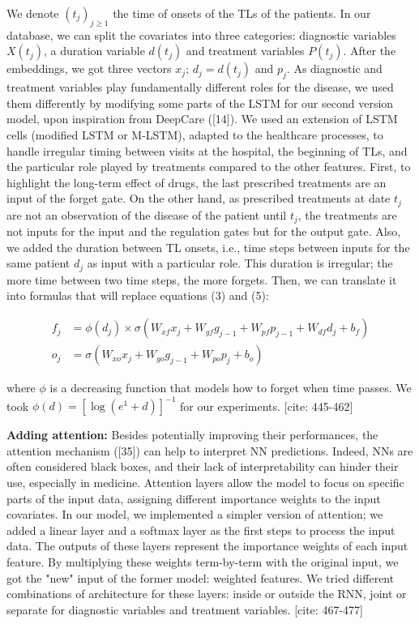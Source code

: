 \documentclass[a4paper,10pt]{article}
\begin{document}
We denote $(t_j)_{j\ge1}$ the time of onsets of the TLs of the patients. In our database, we can split the covariates into three categories: diagnostic variables $X(t_j)$, a duration variable $d(t_j)$ and treatment variables $P(t_j)$. After the embeddings, we got three vectors $x_j$; $d_j = d(t_j)$ and $p_j$. As diagnostic and treatment variables play fundamentally different roles for the disease, we used them differently by modifying some parts of the LSTM for our second version model, upon inspiration from DeepCare ([14]). We used an extension of LSTM cells (modified LSTM or M-LSTM), adapted to the healthcare processes, to handle irregular timing between visits at the hospital, the beginning of TLs, and the particular role played by treatments compared to the other features. First, to highlight the long-term effect of drugs, the last prescribed treatments are an input of the forget gate. On the other hand, as prescribed treatments at date $t_j$ are not an observation of the disease of the patient until $t_j$, the treatments are not inputs for the input and the regulation gates but for the output gate. Also, we added the duration between TL onsets, i.e., time steps between inputs for the same patient $d_j$ as input with a particular role. This duration is irregular; the more time between two time steps, the more forgets. Then, we can translate it into formulas that will replace equations (3) and (5):

\begin{align}
f_j &= \phi(d_j) \times \sigma(W_{xf}x_j + W_{gf}g_{j-1} + W_{pf}p_{j-1} + W_{df}d_j + b_f) \\
o_j &= \sigma(W_{xo}x_j + W_{go}g_{j-1} + W_{po}p_j + b_o)
\end{align}

where $\phi$ is a decreasing function that models how to forget when time passes. We took $\phi(d) = [\log(e^1 + d)]^{-1}$ for our experiments. [cite: 445-462]

\textbf{Adding attention:} Besides potentially improving their performances, the attention mechanism ([35]) can help to interpret NN predictions. Indeed, NNs are often considered black boxes, and their lack of interpretability can hinder their use, especially in medicine. Attention layers allow the model to focus on specific parts of the input data, assigning different importance weights to the input covariates. In our model, we implemented a simpler version of attention; we added a linear layer and a softmax layer as the first steps to process the input data. The outputs of these layers represent the importance weights of each input feature. By multiplying these weights term-by-term with the original input, we got the "new" input of the former model: weighted features. We tried different combinations of architecture for these layers: inside or outside the RNN, joint or separate for diagnostic variables and treatment variables. [cite: 467-477]
\end{document}
